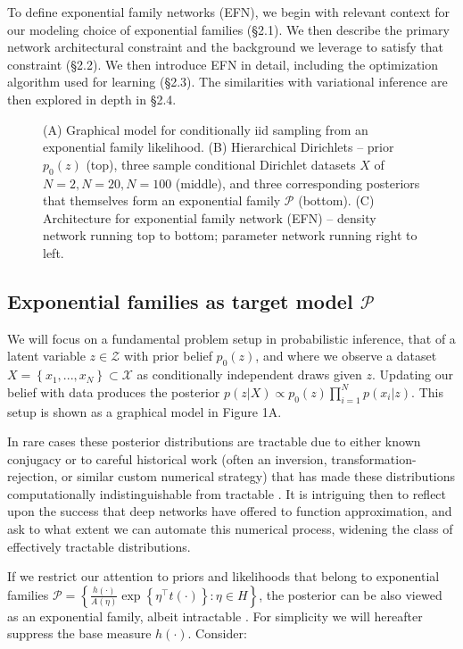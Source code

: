 \documentclass{article}
\begin{document}
 To define exponential family networks (EFN), we begin with relevant context for our modeling choice of exponential families (\S2.1).  We then describe the primary network architectural constraint and the background we leverage to satisfy that constraint (\S2.2). We then introduce EFN in detail, including the optimization algorithm used for learning (\S2.3).  The similarities with variational inference are then explored in depth in \S2.4.
  
\begin{figure}
\centering

  \caption{(A) Graphical model for conditionally iid sampling from an exponential family likelihood.  (B) Hierarchical Dirichlets -- prior $p_0(z)$ (top), three sample conditional Dirichlet datasets $X$ of $N=2, N=20, N=100$ (middle), and three corresponding posteriors that themselves form an exponential family $\mathcal{P}$ (bottom).  (C) Architecture for exponential family network (EFN) -- density network running top to bottom; parameter network running right to left.}
\end{figure}

 \subsection{Exponential families as target model $\mathcal{P}$}

We will focus on a fundamental problem setup in probabilistic inference, that of a latent variable $z \in \mathcal{Z}$ with prior belief $p_0(z)$, and where we observe a dataset $X = \left\{x_1,...,x_N\right\} \subset \mathcal{X}$ as conditionally independent draws given $z$.   Updating our belief with data produces the posterior $p(z | X) \propto p_0(z) \prod_{i=1}^N p(x_i | z)$.  This setup is shown as a graphical model in Figure 1A.

In rare cases these posterior distributions are tractable due to either known conjugacy or to careful historical work (often an inversion, transformation-rejection, or similar custom numerical strategy) that has made these distributions computationally indistinguishable from tractable \cite{Devroye:1986aa}.  It is intriguing then to reflect upon the success that deep networks have offered to function approximation, and ask to what extent we can automate this numerical process, widening the class of effectively tractable distributions.

If we restrict our attention to priors and likelihoods that belong to exponential families $\mathcal{P} = \left\{ \frac{h(\cdot)}{A(\eta)} \exp\left\{ \eta^\top t(\cdot) \right \} : \eta \in H \right\}$, the posterior can be also viewed as an exponential family, albeit intractable \cite{wainwright2008graphical}.  For simplicity we will hereafter suppress the base measure $h(\cdot)$.  Consider:
\end{document}

